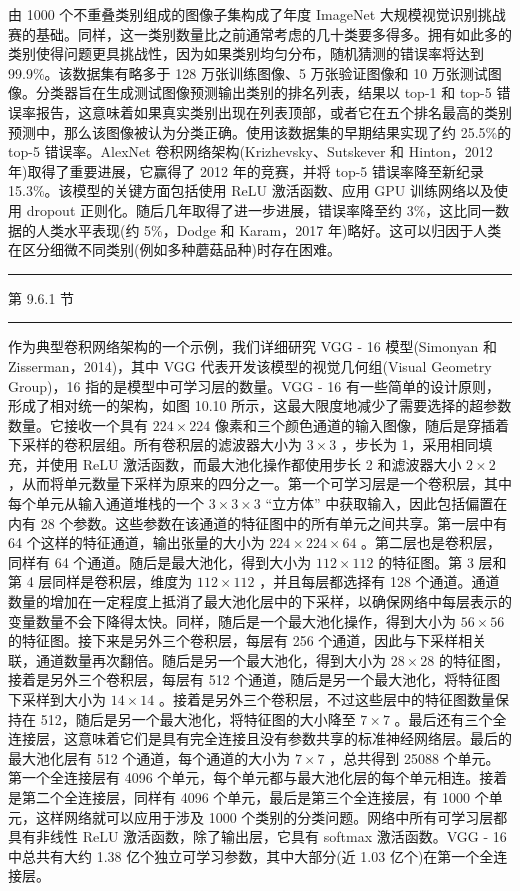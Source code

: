 \documentclass[10pt]{report}
\newcommand{\HRule}{\begin{center}\rule{0.9\linewidth}{0.2mm}\end{center}}
\begin{document}
由 1000 个不重叠类别组成的图像子集构成了年度 ImageNet 大规模视觉识别挑战赛的基础。同样，这一类别数量比之前通常考虑的几十类要多得多。拥有如此多的类别使得问题更具挑战性，因为如果类别均匀分布，随机猜测的错误率将达到 99.9\%。该数据集有略多于 128 万张训练图像、5 万张验证图像和 10 万张测试图像。分类器旨在生成测试图像预测输出类别的排名列表，结果以 top-1 和 top-5 错误率报告，这意味着如果真实类别出现在列表顶部，或者它在五个排名最高的类别预测中，那么该图像被认为分类正确。使用该数据集的早期结果实现了约 25.5\%的 top-5 错误率。AlexNet 卷积网络架构(Krizhevsky、Sutskever 和 Hinton，2012 年)取得了重要进展，它赢得了 2012 年的竞赛，并将 top-5 错误率降至新纪录 15.3\%。该模型的关键方面包括使用 ReLU 激活函数、应用 GPU 训练网络以及使用 dropout 正则化。随后几年取得了进一步进展，错误率降至约 3\%，这比同一数据的人类水平表现(约 5\%，Dodge 和 Karam，2017 年)略好。这可以归因于人类在区分细微不同类别(例如多种蘑菇品种)时存在困难。

\HRule

第 9.6.1 节

\HRule

作为典型卷积网络架构的一个示例，我们详细研究 VGG - 16 模型(Simonyan 和 Zisserman，2014)，其中 VGG 代表开发该模型的视觉几何组(Visual Geometry Group)，16 指的是模型中可学习层的数量。VGG - 16 有一些简单的设计原则，形成了相对统一的架构，如图 10.10 所示，这最大限度地减少了需要选择的超参数数量。它接收一个具有 \({224} \times  {224}\) 像素和三个颜色通道的输入图像，随后是穿插着下采样的卷积层组。所有卷积层的滤波器大小为 \(3 \times  3\) ，步长为 1，采用相同填充，并使用 ReLU 激活函数，而最大池化操作都使用步长 2 和滤波器大小 \(2 \times  2\) ，从而将单元数量下采样为原来的四分之一。第一个可学习层是一个卷积层，其中每个单元从输入通道堆栈的一个 \(3 \times  3 \times  3\) “立方体” 中获取输入，因此包括偏置在内有 28 个参数。这些参数在该通道的特征图中的所有单元之间共享。第一层中有 64 个这样的特征通道，输出张量的大小为 \({224} \times  {224} \times  {64}\) 。第二层也是卷积层，同样有 64 个通道。随后是最大池化，得到大小为 \({112} \times  {112}\) 的特征图。第 3 层和第 4 层同样是卷积层，维度为 \({112} \times  {112}\) ，并且每层都选择有 128 个通道。通道数量的增加在一定程度上抵消了最大池化层中的下采样，以确保网络中每层表示的变量数量不会下降得太快。同样，随后是一个最大池化操作，得到大小为 \({56} \times  {56}\) 的特征图。接下来是另外三个卷积层，每层有 256 个通道，因此与下采样相关联，通道数量再次翻倍。随后是另一个最大池化，得到大小为 \({28} \times  {28}\) 的特征图，接着是另外三个卷积层，每层有 512 个通道，随后是另一个最大池化，将特征图下采样到大小为 \({14} \times  {14}\) 。接着是另外三个卷积层，不过这些层中的特征图数量保持在 512，随后是另一个最大池化，将特征图的大小降至 \(7 \times  7\) 。最后还有三个全连接层，这意味着它们是具有完全连接且没有参数共享的标准神经网络层。最后的最大池化层有 512 个通道，每个通道的大小为 \(7 \times  7\) ，总共得到 25088 个单元。第一个全连接层有 4096 个单元，每个单元都与最大池化层的每个单元相连。接着是第二个全连接层，同样有 4096 个单元，最后是第三个全连接层，有 1000 个单元，这样网络就可以应用于涉及 1000 个类别的分类问题。网络中所有可学习层都具有非线性 ReLU 激活函数，除了输出层，它具有 softmax 激活函数。VGG - 16 中总共有大约 1.38 亿个独立可学习参数，其中大部分(近 1.03 亿个)在第一个全连接层。
\end{document}

